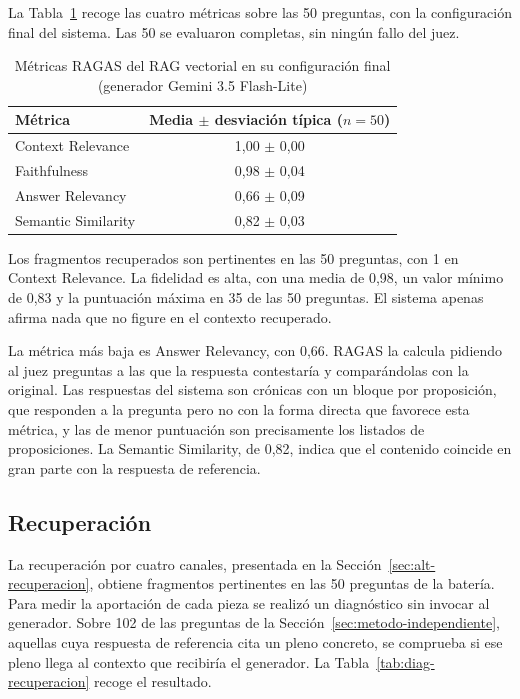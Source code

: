 \documentclass[11pt, a4paper]{report}
\begin{document}
	La Tabla~\ref{tab:ragas-resultados} recoge las cuatro métricas sobre las 50
	preguntas, con la configuración final del sistema. Las 50 se evaluaron
	completas, sin ningún fallo del juez.

	\begin{table}[H]
		\centering
		\begin{tabular}{|l|c|}
			\hline
			\rowcolor{tabla-header}
			\textbf{Métrica} & \textbf{Media $\pm$ desviación típica ($n=50$)} \\
			\hline
			Context Relevance & 1,00 $\pm$ 0,00 \\
			\hline
			\rowcolor{fila-alterna}
			Faithfulness & 0,98 $\pm$ 0,04 \\
			\hline
			Answer Relevancy & 0,66 $\pm$ 0,09 \\
			\hline
			\rowcolor{fila-alterna}
			Semantic Similarity & 0,82 $\pm$ 0,03 \\
			\hline
		\end{tabular}
		\caption{Métricas RAGAS del RAG vectorial en su configuración final (generador Gemini 3.5 Flash-Lite)}
		\label{tab:ragas-resultados}
	\end{table}

	Los fragmentos recuperados son pertinentes en las 50 preguntas, con 1 en
	Context Relevance. La fidelidad es alta, con una media de 0,98, un valor
	mínimo de 0,83 y la puntuación máxima en 35 de las 50 preguntas. El sistema
	apenas afirma nada que no figure en el contexto recuperado.

	La métrica más baja es Answer Relevancy, con 0,66. RAGAS la calcula pidiendo
	al juez preguntas a las que la respuesta contestaría y comparándolas con la
	original. Las respuestas del sistema son crónicas con un bloque por
	proposición, que responden a la pregunta pero no con la forma directa que
	favorece esta métrica, y las de menor puntuación son precisamente los listados
	de proposiciones. La Semantic Similarity, de 0,82, indica que el contenido coincide en gran parte con la respuesta de referencia.

	\subsection{Recuperación}
	\label{sec:analisis-recuperacion}
	\label{sec:reordenacion-local}

	La recuperación por cuatro canales, presentada en la
	Sección~\ref{sec:alt-recuperacion}, obtiene fragmentos pertinentes en las 50
	preguntas de la batería. Para medir la aportación de cada pieza se realizó un
	diagnóstico sin invocar al generador. Sobre 102 de las preguntas de la
	Sección~\ref{sec:metodo-independiente}, aquellas cuya respuesta de referencia cita un
	pleno concreto, se comprueba si ese pleno llega al contexto que recibiría el generador. La
	Tabla~\ref{tab:diag-recuperacion} recoge el resultado.
\end{document}
